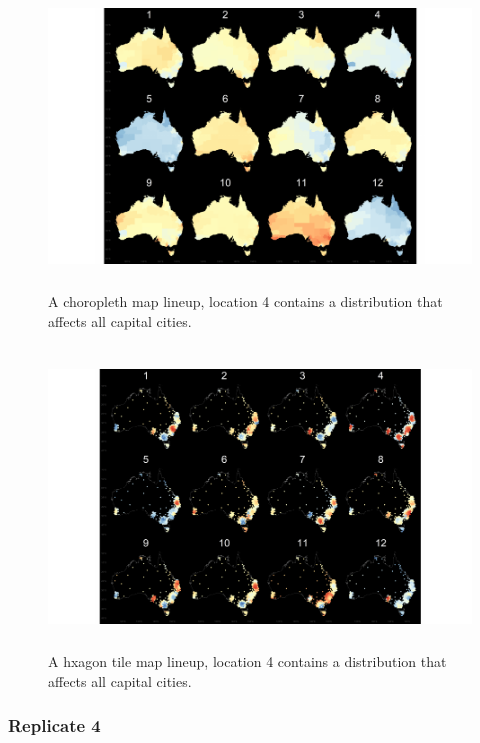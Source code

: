\documentclass{monashthesis}
\begin{document}
\begin{figure}[H]
\centering
\includegraphics[height=8cm]{lineups/cities-geo4-1.pdf}
\caption{\label{fig:cities-geo4}A choropleth map lineup, location 4 contains a distribution that affects all capital cities.}
\end{figure}

\begin{figure}[H]
\centering
\includegraphics[height=8cm]{lineups/cities-hex4-1.pdf}
\caption{\label{fig:cities-hex4}A hxagon tile map lineup, location 4 contains a distribution that affects all capital cities.}
\end{figure}

\hypertarget{replicate-4}{%
\subsubsection{Replicate 4}\label{replicate-4}}
\end{document}
